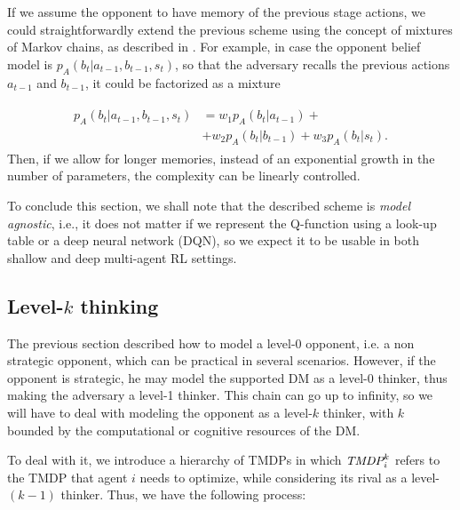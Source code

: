 \documentclass[letterpaper]{article} %
\begin{document}
If we assume the opponent to have memory of the previous stage actions, we could straightforwardly extend the previous scheme using the concept of mixtures of Markov chains, as described in \cite{raftery1985model}. For example, in case the opponent belief model
is $p_{A}(b_t | a_{t-1}, b_{t-1}, s_t)$, so that the adversary recalls 
 the previous actions $a_{t-1}$ and $b_{t-1}$, it could be factorized as a mixture 

\begin{align*}
\begin{split}
p_{A}(b_t | a_{t-1}, b_{t-1}, s_t) &= w_1 p_{A}(b_t | a_{t-1})  +\\ &+ w_2 p_{A}(b_t | b_{t-1})
 + w_3 p_{A}(b_t | s_t).
 \end{split}
\end{align*}
Then, if we allow for longer memories, instead of an exponential growth in the number of parameters, the complexity can be linearly controlled.

To conclude this section, we shall note that the described scheme is \emph{model agnostic}, i.e., it does not matter if we represent the Q-function using a look-up table or a deep neural network (DQN), so we expect it to be usable in both shallow and deep multi-agent RL settings.

\subsection{Level-$k$ thinking}\label{sec:k}


The previous section described how to model a level-0 opponent, i.e. a non strategic opponent, which can be practical in several scenarios. However, if the opponent is strategic, he may model the supported DM as a level-0 thinker, thus making the adversary a level-1 thinker. This chain can go up to infinity, so we will have to deal with modeling the opponent as a level-$k$ thinker, with $k$ bounded by the computational or cognitive resources of the DM.

To deal with it, we introduce a hierarchy of TMDPs in which 
 $\emph{TMDP}_{i}^k$ refers to the TMDP that agent $i$ needs to optimize,
 while considering its rival as a level-$(k-1)$ thinker.
Thus, we have the following process:
\end{document}
